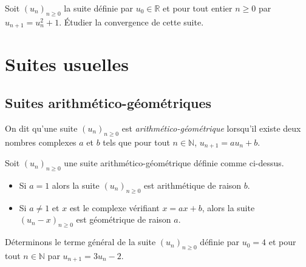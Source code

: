 \documentclass[a4paper,10pt]{report}
\begin{document}
\newpage

$\phantom{test}$
\vspace{10cm}

\begin{exa} Soit $(u_n)_{n \geq 0}$ la suite définie par $u_0 \in \mathbb{R}$ et pour tout entier $n \geq 0$ par $u_{n+1}=u_n^2+1$. Étudier la convergence de cette suite.
\end{exa}
\section{Suites usuelles}
\subsection{Suites arithmético-géométriques}

\begin{defin}
On dit qu'une suite $(u_n)_{n \geq 0}$ est \textit{arithmético-géométrique} lorsqu'il existe deux nombres complexes $a$ et $b$ tels que pour tout $n \in \mathbb{N}$, $u_{n+1} = a u_n + b$.
\end{defin}

\begin{thm}
Soit $(u_n)_{n \geq 0}$ une suite arithmético-géométrique définie comme ci-dessus.
\begin{itemize}
\item Si $a=1$ alors la suite $(u_n)_{n \geq 0}$ est arithmétique de raison $b$.
\item Si $a \neq 1$ et $x$ est le complexe vérifiant $x=ax+b$, alors la suite $(u_n-x)_{n \geq 0}$ est géométrique de raison $a$.
\end{itemize}
\end{thm}

\begin{ex} Déterminons le terme général de la suite $(u_n)_{n \geq 0}$ définie par $u_0=4$ et pour tout $n \in \mathbb{N}$ par $u_{n+1}=3u_n-2$.

\newpage
%

\vspace{4cm}
\end{ex}
\end{document}
